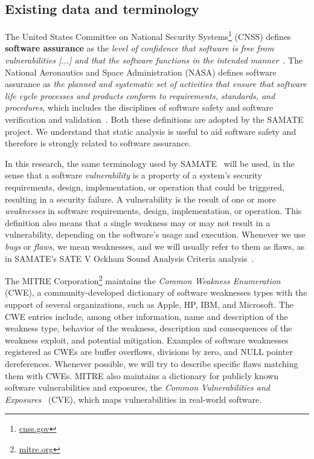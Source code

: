 \subsection{Existing data and terminology}
\label{sub:terminology}

The United States Committee on National Security
Systems\footnote{\url{cnss.gov}} (CNSS) defines \textbf{software assurance} as
the \textit{level of confidence that software is free from vulnerabilities [...]
and that the software functions in the intended
manner}~\citep{instruction20034009}. The National Aeronautics and Space
Administration (NASA) defines software assurance as \textit{the planned and
systematic set of activities that ensure that software life cycle processes and
products conform to requirements, standards, and procedures}, which includes
the disciplines of software safety and software verification and
validation~\citep{nasastd8739}. Both these definitions are adopted by the SAMATE
project. We understand that static analysis is useful to aid software safety
and therefore is strongly related to software assurance.

In this research, the same terminology used by
SAMATE~\citep{black_counting_2011} will be used, in the sense that a software
\textit{vulnerability} is a property of a system's security requirements,
design, implementation, or operation that could be triggered, resulting in a
security failure. A vulnerability is the result of one or more
\textit{weaknesses} in software requirements, design, implementation, or
operation. This definition also means that a single weakness may or may not result in a
vulnerability, depending on the software's usage and execution. Whenever we use
\textit{bugs} or \textit{flaws}, we mean weaknesses, and we will usually refer
to them as flaws, as in SAMATE's SATE V Ockham Sound Analysis Criteria
analysis~\citep{black_sate_2016}.

The MITRE Corporation\footnote{\url{mitre.org}} maintains the \textit{Common Weakness
Enumeration}~\citep{cwe_page} (CWE), a community-developed dictionary of
software weaknesses types with the support of several organizations, such as Apple,
HP, IBM, and Microsoft. The CWE entries include, among other information, name
and description of the weakness type, behavior of the weakness, description and
consequences of the weakness exploit, and potential mitigation. Examples of
software weaknesses registered as CWEs are buffer overflows, divisions by zero,
and NULL pointer dereferences. Whenever possible, we will try to describe
specific flaws matching them with CWEs. MITRE also maintains a dictionary for
publicly known software vulnerabilities and exposures, the \textit{Common
Vulnerabilities and Exposures}~\citep{cve_page} (CVE), which maps vulnerabilities
in real-world software.


